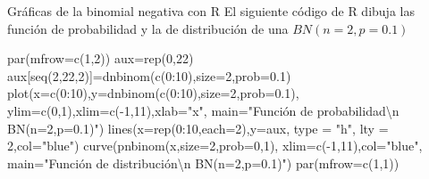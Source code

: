\documentclass[
  ignorenonframetext,
  aspectratio=169]{beamer}
\newenvironment{Shaded}{\begin{snugshade}}{\end{snugshade}}
\newcommand{\AttributeTok}[1]{\textcolor[rgb]{0.40,0.45,0.13}{#1}}
\newcommand{\DecValTok}[1]{\textcolor[rgb]{0.68,0.00,0.00}{#1}}
\newcommand{\FloatTok}[1]{\textcolor[rgb]{0.68,0.00,0.00}{#1}}
\newcommand{\FunctionTok}[1]{\textcolor[rgb]{0.28,0.35,0.67}{#1}}
\newcommand{\NormalTok}[1]{\textcolor[rgb]{0.00,0.23,0.31}{#1}}
\newcommand{\OtherTok}[1]{\textcolor[rgb]{0.00,0.23,0.31}{#1}}
\newcommand{\SpecialCharTok}[1]{\textcolor[rgb]{0.37,0.37,0.37}{#1}}
\newcommand{\StringTok}[1]{\textcolor[rgb]{0.13,0.47,0.30}{#1}}
\begin{document}
\begin{frame}[fragile]{Gráficas de la binomial negativa con R}
\protect\hypertarget{gruxe1ficas-de-la-binomial-negativa-con-r}{}
El siguiente código de R dibuja las función de probabilidad y la de
distribución de una \(BN(n=2,p=0.1)\)

\begin{Shaded}
\begin{Highlighting}[]
\FunctionTok{par}\NormalTok{(}\AttributeTok{mfrow=}\FunctionTok{c}\NormalTok{(}\DecValTok{1}\NormalTok{,}\DecValTok{2}\NormalTok{))}
\NormalTok{aux}\OtherTok{=}\FunctionTok{rep}\NormalTok{(}\DecValTok{0}\NormalTok{,}\DecValTok{22}\NormalTok{)}
\NormalTok{aux[}\FunctionTok{seq}\NormalTok{(}\DecValTok{2}\NormalTok{,}\DecValTok{22}\NormalTok{,}\DecValTok{2}\NormalTok{)]}\OtherTok{=}\FunctionTok{dnbinom}\NormalTok{(}\FunctionTok{c}\NormalTok{(}\DecValTok{0}\SpecialCharTok{:}\DecValTok{10}\NormalTok{),}\AttributeTok{size=}\DecValTok{2}\NormalTok{,}\AttributeTok{prob=}\FloatTok{0.1}\NormalTok{)}
\FunctionTok{plot}\NormalTok{(}\AttributeTok{x=}\FunctionTok{c}\NormalTok{(}\DecValTok{0}\SpecialCharTok{:}\DecValTok{10}\NormalTok{),}\AttributeTok{y=}\FunctionTok{dnbinom}\NormalTok{(}\FunctionTok{c}\NormalTok{(}\DecValTok{0}\SpecialCharTok{:}\DecValTok{10}\NormalTok{),}\AttributeTok{size=}\DecValTok{2}\NormalTok{,}\AttributeTok{prob=}\FloatTok{0.1}\NormalTok{),}
  \AttributeTok{ylim=}\FunctionTok{c}\NormalTok{(}\DecValTok{0}\NormalTok{,}\DecValTok{1}\NormalTok{),}\AttributeTok{xlim=}\FunctionTok{c}\NormalTok{(}\SpecialCharTok{{-}}\DecValTok{1}\NormalTok{,}\DecValTok{11}\NormalTok{),}\AttributeTok{xlab=}\StringTok{"x"}\NormalTok{,}
  \AttributeTok{main=}\StringTok{"Función de probabilidad}\SpecialCharTok{\textbackslash{}n}\StringTok{ BN(n=2,p=0.1)"}\NormalTok{)}
\FunctionTok{lines}\NormalTok{(}\AttributeTok{x=}\FunctionTok{rep}\NormalTok{(}\DecValTok{0}\SpecialCharTok{:}\DecValTok{10}\NormalTok{,}\AttributeTok{each=}\DecValTok{2}\NormalTok{),}\AttributeTok{y=}\NormalTok{aux, }\AttributeTok{type =} \StringTok{"h"}\NormalTok{, }\AttributeTok{lty =} \DecValTok{2}\NormalTok{,}\AttributeTok{col=}\StringTok{"blue"}\NormalTok{)}
\FunctionTok{curve}\NormalTok{(}\FunctionTok{pnbinom}\NormalTok{(x,}\AttributeTok{size=}\DecValTok{2}\NormalTok{,}\AttributeTok{prob=}\DecValTok{0}\NormalTok{,}\DecValTok{1}\NormalTok{),}
  \AttributeTok{xlim=}\FunctionTok{c}\NormalTok{(}\SpecialCharTok{{-}}\DecValTok{1}\NormalTok{,}\DecValTok{11}\NormalTok{),}\AttributeTok{col=}\StringTok{"blue"}\NormalTok{,}
  \AttributeTok{main=}\StringTok{"Función de distribución}\SpecialCharTok{\textbackslash{}n}\StringTok{ BN(n=2,p=0.1)"}\NormalTok{)}
\FunctionTok{par}\NormalTok{(}\AttributeTok{mfrow=}\FunctionTok{c}\NormalTok{(}\DecValTok{1}\NormalTok{,}\DecValTok{1}\NormalTok{))}
\end{Highlighting}
\end{Shaded}
\end{frame}
\end{document}

